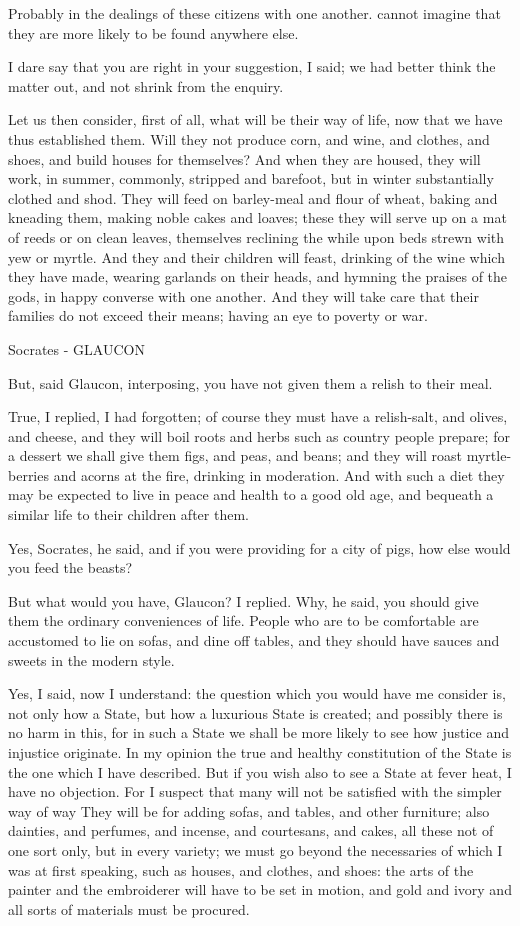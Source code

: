 Probably in the dealings of these citizens with one another. cannot imagine that they are more likely to be found anywhere else.

I dare say that you are right in your suggestion, I said; we had better think the matter out, and not shrink from the enquiry.

Let us then consider, first of all, what will be their way of life, now that we have thus established them. Will they not produce corn, and wine, and clothes, and shoes, and build houses for themselves? And when they are housed, they will work, in summer, commonly, stripped and barefoot, but in winter substantially clothed and shod. They will feed on barley-meal and flour of wheat, baking and kneading them, making noble cakes and loaves; these they will serve up on a mat of reeds or on clean leaves, themselves reclining the while upon beds strewn with yew or myrtle. And they and their children will feast, drinking of the wine which they have made, wearing garlands on their heads, and hymning the praises of the gods, in happy converse with one another. And they will take care that their families do not exceed their means; having an eye to poverty or war.

Socrates - GLAUCON

But, said Glaucon, interposing, you have not given them a relish to their meal.

True, I replied, I had forgotten; of course they must have a relish-salt, and olives, and cheese, and they will boil roots and herbs such as country people prepare; for a dessert we shall give them figs, and peas, and beans; and they will roast myrtle-berries and acorns at the fire, drinking in moderation. And with such a diet they may be expected to live in peace and health to a good old age, and bequeath a similar life to their children after them.

Yes, Socrates, he said, and if you were providing for a city of pigs, how else would you feed the beasts?

But what would you have, Glaucon? I replied.
Why, he said, you should give them the ordinary conveniences of life. People who are to be comfortable are accustomed to lie on sofas, and dine off tables, and they should have sauces and sweets in the modern style.

Yes, I said, now I understand: the question which you would have me consider is, not only how a State, but how a luxurious State is created; and possibly there is no harm in this, for in such a State we shall be more likely to see how justice and injustice originate. In my opinion the true and healthy constitution of the State is the one which I have described. But if you wish also to see a State at fever heat, I have no objection. For I suspect that many will not be satisfied with the simpler way of way They will be for adding sofas, and tables, and other furniture; also dainties, and perfumes, and incense, and courtesans, and cakes, all these not of one sort only, but in every variety; we must go beyond the necessaries of which I was at first speaking, such as houses, and clothes, and shoes: the arts of the painter and the embroiderer will have to be set in motion, and gold and ivory and all sorts of materials must be procured.

